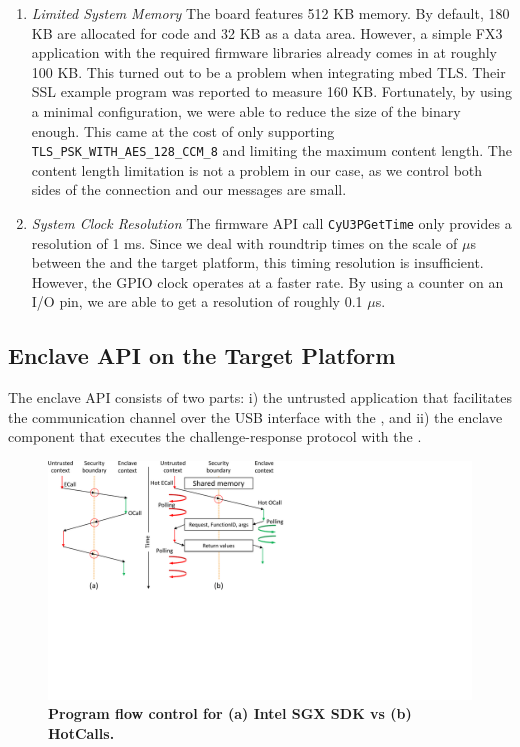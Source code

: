\begin{enumerate}
  \item \emph{Limited System Memory} The board features 512 KB memory. By default, 180 KB are allocated for code and 32 KB as a data area. However, a simple FX3 application with the required firmware libraries already comes in at roughly 100 KB. This turned out to be a problem when integrating mbed TLS. Their SSL example program was reported to measure 160 KB. Fortunately, by using a minimal configuration, we were able to reduce the size of the binary enough. This came at the cost of only supporting \texttt{TLS\_PSK\_WITH\_AES\_128\_CCM\_8} and limiting the maximum content length. The content length limitation is not a problem in our case, as we control both sides of the connection and our messages are small.

 \item \emph{System Clock Resolution} The firmware API call \texttt{CyU3PGetTime} only provides a resolution of 1 ms. Since we deal with roundtrip times on the scale of $\mu$s between the \device and the target platform, this timing resolution is insufficient. However, the GPIO clock operates at a faster rate. By using a counter on an I/O pin, we are able to get a resolution of roughly 0.1 $\mu$s.
  
\end{enumerate}

\subsection{\name Enclave API on the Target Platform} 

The \name enclave API consists of two parts: i) the untrusted application that facilitates the communication channel over the USB interface with the \device, and ii) the enclave component that executes the challenge-response protocol with the \device.

\begin{figure}[t]
  \centering
    \includegraphics[trim={0 9cm 15cm 0}, clip, width=\linewidth]{chapters/ProximiTEE/images_new/hotcalls.pdf}
    \caption[Program flow control for Intel SGX SDK vs HotCalls]{\textbf{Program flow control for (a) Intel SGX SDK vs (b) HotCalls.} }
    \label{fig:hotcalls}
\end{figure}

